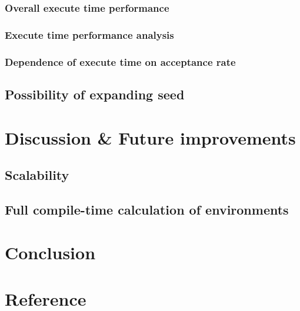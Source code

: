 \documentclass[11pt,a4paper]{scrartcl}
\begin{document}
\subsubsection{Overall execute time performance}
\subsubsection{Execute time performance analysis}
\subsubsection{Dependence of execute time on acceptance rate}
\subsection{Possibility of expanding seed}
\section{Discussion \& Future improvements}
\subsection{Scalability}
\subsection{Full compile-time calculation of environments}
\section{Conclusion}
\section{Reference}
\end{document}
